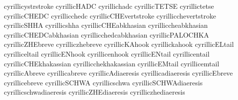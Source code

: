  cyrillicystrstroke         {}
 cyrillicHADC               {}
 cyrillichadc               {}
 cyrillicTETSE              {}
 cyrillictetse              {}
 cyrillicCHEDC              {}
 cyrillicchedc              {}
 cyrillicCHEvertstroke      {}
 cyrillicchevertstroke      {}
 cyrillicSHHA               {}
 cyrillicshha               {}
 cyrillicCHEabkhasian       {}
 cyrilliccheabkhasian       {}
 cyrillicCHEDCabkhasian     {}
 cyrillicchedcabkhasian     {}
 cyrillicPALOCHKA           {}
 cyrillicZHEbreve           {}
 cyrilliczhebreve           {}
 cyrillicKAhook             {}
 cyrillickahook             {}
 cyrillicELtail             {}
 cyrilliceltail             {}
 cyrillicENhook             {}
 cyrillicenhook             {}
 cyrillicENtail             {}
 cyrillicentail             {}
 cyrillicCHEkhakassian      {}
 cyrillicchekhakassian      {}
 cyrillicEMtail             {}
 cyrillicemtail             {}
 cyrillicAbreve             {}
 cyrillicabreve             {}
 cyrillicAdiaeresis         {}
 cyrillicadiaeresis         {}
 cyrillicEbreve             {}
 cyrillicebreve             {}
 cyrillicSCHWA              {}
 cyrillicschwa              {}
 cyrillicSCHWAdiaeresis     {}
 cyrillicschwadiaeresis     {}
 cyrillicZHEdiaeresis       {}
 cyrilliczhediaeresis       {}
